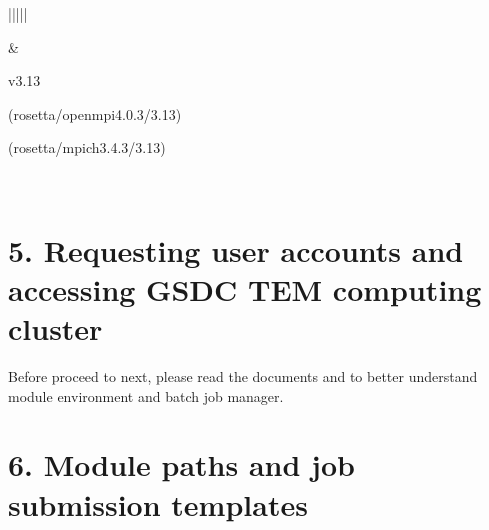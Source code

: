 \documentclass[a4paper,11pt,english]{sphinxmanual}
\begin{document}
\begin{savenotes}
\begin{tabulary}{\linewidth}[t]{|||||}
\begin{itemize}
\end{itemize}
&
\begin{DUlineblock}{0em}
\item[] v3.13
\item[] (rosetta/openmpi\sphinxhyphen{}4.0.3/3.13)
\item[] (rosetta/mpich\sphinxhyphen{}3.4.3/3.13)
\end{DUlineblock}
\\
\sphinxbottomrule
\end{tabulary}
\sphinxtableafterendhook\par
\sphinxattableend\end{savenotes}


\section{5. Requesting user accounts and accessing GSDC TEM computing cluster}
\label{\detokenize{newfarm:requesting-user-accounts-and-accessing-gsdc-tem-computing-cluster}}
\sphinxAtStartPar
{\hyperref[\detokenize{guide:requesting-accounts}]{}}

\sphinxAtStartPar
Before proceed to next, please read the documents {\hyperref[\detokenize{guide:module-details}]{}} and {\hyperref[\detokenize{guide:batch-details}]{}} to better understand module environment and batch job manager.


\section{6. Module paths and job submission templates}
\label{\detokenize{newfarm:module-paths-and-job-submission-templates}}
\end{document}
